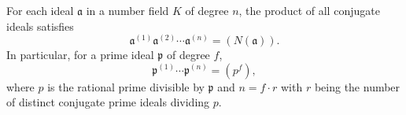 For each ideal $\mathfrak{a}$ in a number field $K$ of degree $n$, the product of all conjugate ideals satisfies
$$\mathfrak{a}^{(1)} \mathfrak{a}^{(2)} \cdots \mathfrak{a}^{(n)} = (N(\mathfrak{a})).$$
In particular, for a prime ideal $\mathfrak{p}$ of degree $f$,
$$\mathfrak{p}^{(1)} \cdots \mathfrak{p}^{(n)} = (p^f),$$
where $p$ is the rational prime divisible by $\mathfrak{p}$ and $n = f \cdot r$ with $r$ being the number of distinct conjugate prime ideals dividing $p$.
